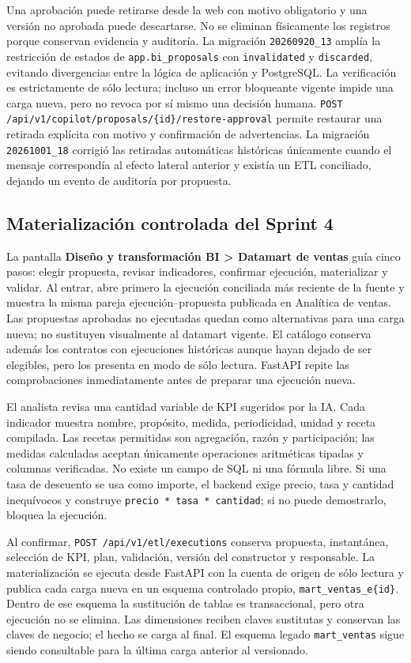 \documentclass[11pt,letterpaper]{article}
\newcommand{\file}[1]{\texttt{#1}}
\begin{document}
Una aprobación puede retirarse desde la web con motivo obligatorio y una versión no aprobada puede descartarse. No se eliminan físicamente los registros porque conservan evidencia y auditoría. La migración \file{20260920\_13} amplía la restricción de estados de \file{app.bi\_proposals} con \file{invalidated} y \file{discarded}, evitando divergencias entre la lógica de aplicación y PostgreSQL. La verificación es estrictamente de sólo lectura; incluso un error bloqueante vigente impide una carga nueva, pero no revoca por sí mismo una decisión humana. \file{POST /api/v1/copilot/proposals/\{id\}/restore-approval} permite restaurar una retirada explícita con motivo y confirmación de advertencias. La migración \file{20261001\_18} corrigió las retiradas automáticas históricas únicamente cuando el mensaje correspondía al efecto lateral anterior y existía un ETL conciliado, dejando un evento de auditoría por propuesta.

\subsection{Materialización controlada del Sprint 4}

La pantalla \textbf{Diseño y transformación BI > Datamart de ventas} guía cinco pasos: elegir propuesta, revisar indicadores, confirmar ejecución, materializar y validar. Al entrar, abre primero la ejecución conciliada más reciente de la fuente y muestra la misma pareja ejecución--propuesta publicada en Analítica de ventas. Las propuestas aprobadas no ejecutadas quedan como alternativas para una carga nueva; no sustituyen visualmente al datamart vigente. El catálogo conserva además los contratos con ejecuciones históricas aunque hayan dejado de ser elegibles, pero los presenta en modo de sólo lectura. FastAPI repite las comprobaciones inmediatamente antes de preparar una ejecución nueva.

El analista revisa una cantidad variable de KPI sugeridos por la IA. Cada indicador muestra nombre, propósito, medida, periodicidad, unidad y receta compilada. Las recetas permitidas son agregación, razón y participación; las medidas calculadas aceptan únicamente operaciones aritméticas tipadas y columnas verificadas. No existe un campo de SQL ni una fórmula libre. Si una tasa de descuento se usa como importe, el backend exige precio, tasa y cantidad inequívocos y construye \file{precio * tasa * cantidad}; si no puede demostrarlo, bloquea la ejecución.

Al confirmar, \file{POST /api/v1/etl/executions} conserva propuesta, instantánea, selección de KPI, plan, validación, versión del constructor y responsable. La materialización se ejecuta desde FastAPI con la cuenta de origen de sólo lectura y publica cada carga nueva en un esquema controlado propio, \file{mart\_ventas\_e\{id\}}. Dentro de ese esquema la sustitución de tablas es transaccional, pero otra ejecución no se elimina. Las dimensiones reciben claves sustitutas y conservan las claves de negocio; el hecho se carga al final. El esquema legado \file{mart\_ventas} sigue siendo consultable para la última carga anterior al versionado.
\end{document}
